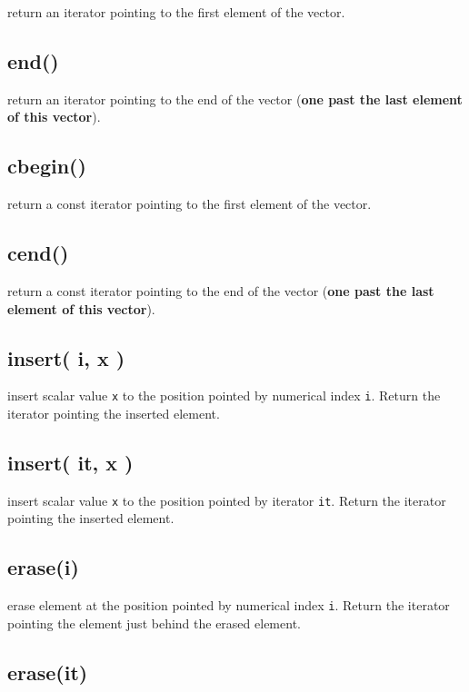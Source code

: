 \documentclass[]{book}
\theoremstyle{definition}
\theoremstyle{definition}
\theoremstyle{remark}
\begin{document}
return an iterator pointing to the first element of the vector.

\subsection{end()}\label{end}

return an iterator pointing to the end of the vector (\textbf{one past
the last element of this vector}).

\subsection{cbegin()}\label{cbegin}

return a const iterator pointing to the first element of the vector.

\subsection{cend()}\label{cend}

return a const iterator pointing to the end of the vector (\textbf{one
past the last element of this vector}).

\subsection{insert( i, x )}\label{insert-i-x}

insert scalar value \texttt{x} to the position pointed by numerical
index \texttt{i}. Return the iterator pointing the inserted element.

\subsection{insert( it, x )}\label{insert-it-x}

insert scalar value \texttt{x} to the position pointed by iterator
\texttt{it}. Return the iterator pointing the inserted element.

\subsection{erase(i)}\label{erasei}

erase element at the position pointed by numerical index \texttt{i}.
Return the iterator pointing the element just behind the erased element.

\subsection{erase(it)}\label{eraseit}
\end{document}
